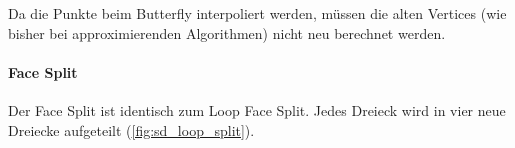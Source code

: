 Da die Punkte beim Butterfly interpoliert werden, müssen die alten Vertices
(wie bisher bei approximierenden Algorithmen) nicht neu berechnet werden. 

\paragraph*{Face Split}
Der Face Split ist identisch zum Loop Face Split.
Jedes Dreieck wird in vier neue Dreiecke aufgeteilt (\autoref{fig:sd_loop_split}).
\cite[S. 64 ff.]{Standford.24.07.2015} \cite[S. 72 ff.]{Zorin.subdivcourse}
\cite{Seeger01asub-atomic}
\cite{Gamasutra}
\cite{Sharp}
\cite{Zorin:1996:ISM:237170.237254}
